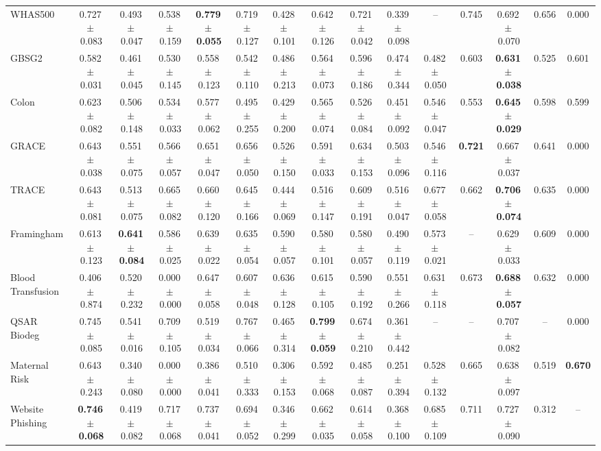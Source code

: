 \documentclass[8pt]{extarticle}
\begin{document}
\begin{longtable}{l*{14}{c}}
WHAS500 & 0.727\,$\pm$\,0.083 & 0.493\,$\pm$\,0.047 & 0.538\,$\pm$\,0.159 & \textbf{0.779\,$\pm$\,0.055} & 0.719\,$\pm$\,0.127 & 0.428\,$\pm$\,0.101 & 0.642\,$\pm$\,0.126 & 0.721\,$\pm$\,0.042 & 0.339\,$\pm$\,0.098 & -- & 0.745 & 0.692\,$\pm$\,0.070 & 0.656 & 0.000 \\
GBSG2 & 0.582\,$\pm$\,0.031 & 0.461\,$\pm$\,0.045 & 0.530\,$\pm$\,0.145 & 0.558\,$\pm$\,0.123 & 0.542\,$\pm$\,0.110 & 0.486\,$\pm$\,0.213 & 0.564\,$\pm$\,0.073 & 0.596\,$\pm$\,0.186 & 0.474\,$\pm$\,0.344 & 0.482\,$\pm$\,0.050 & 0.603 & \textbf{0.631\,$\pm$\,0.038} & 0.525 & 0.601 \\
Colon & 0.623\,$\pm$\,0.082 & 0.506\,$\pm$\,0.148 & 0.534\,$\pm$\,0.033 & 0.577\,$\pm$\,0.062 & 0.495\,$\pm$\,0.255 & 0.429\,$\pm$\,0.200 & 0.565\,$\pm$\,0.074 & 0.526\,$\pm$\,0.084 & 0.451\,$\pm$\,0.092 & 0.546\,$\pm$\,0.047 & 0.553 & \textbf{0.645\,$\pm$\,0.029} & 0.598 & 0.599 \\
GRACE & 0.643\,$\pm$\,0.038 & 0.551\,$\pm$\,0.075 & 0.566\,$\pm$\,0.057 & 0.651\,$\pm$\,0.047 & 0.656\,$\pm$\,0.050 & 0.526\,$\pm$\,0.150 & 0.591\,$\pm$\,0.033 & 0.634\,$\pm$\,0.153 & 0.503\,$\pm$\,0.096 & 0.546\,$\pm$\,0.116 & \textbf{0.721} & 0.667\,$\pm$\,0.037 & 0.641 & 0.000 \\
TRACE & 0.643\,$\pm$\,0.081 & 0.513\,$\pm$\,0.075 & 0.665\,$\pm$\,0.082 & 0.660\,$\pm$\,0.120 & 0.645\,$\pm$\,0.166 & 0.444\,$\pm$\,0.069 & 0.516\,$\pm$\,0.147 & 0.609\,$\pm$\,0.191 & 0.516\,$\pm$\,0.047 & 0.677\,$\pm$\,0.058 & 0.662 & \textbf{0.706\,$\pm$\,0.074} & 0.635 & 0.000 \\
Framingham & 0.613\,$\pm$\,0.123 & \textbf{0.641\,$\pm$\,0.084} & 0.586\,$\pm$\,0.025 & 0.639\,$\pm$\,0.022 & 0.635\,$\pm$\,0.054 & 0.590\,$\pm$\,0.057 & 0.580\,$\pm$\,0.101 & 0.580\,$\pm$\,0.057 & 0.490\,$\pm$\,0.119 & 0.573\,$\pm$\,0.021 & -- & 0.629\,$\pm$\,0.033 & 0.609 & 0.000 \\
Blood Transfusion & 0.406\,$\pm$\,0.874 & 0.520\,$\pm$\,0.232 & 0.000\,$\pm$\,0.000 & 0.647\,$\pm$\,0.058 & 0.607\,$\pm$\,0.048 & 0.636\,$\pm$\,0.128 & 0.615\,$\pm$\,0.105 & 0.590\,$\pm$\,0.192 & 0.551\,$\pm$\,0.266 & 0.631\,$\pm$\,0.118 & 0.673 & \textbf{0.688\,$\pm$\,0.057} & 0.632 & 0.000 \\
QSAR Biodeg & 0.745\,$\pm$\,0.085 & 0.541\,$\pm$\,0.016 & 0.709\,$\pm$\,0.105 & 0.519\,$\pm$\,0.034 & 0.767\,$\pm$\,0.066 & 0.465\,$\pm$\,0.314 & \textbf{0.799\,$\pm$\,0.059} & 0.674\,$\pm$\,0.210 & 0.361\,$\pm$\,0.442 & -- & -- & 0.707\,$\pm$\,0.082 & -- & 0.000 \\
Maternal Risk & 0.643\,$\pm$\,0.243 & 0.340\,$\pm$\,0.080 & 0.000\,$\pm$\,0.000 & 0.386\,$\pm$\,0.041 & 0.510\,$\pm$\,0.333 & 0.306\,$\pm$\,0.153 & 0.592\,$\pm$\,0.068 & 0.485\,$\pm$\,0.087 & 0.251\,$\pm$\,0.394 & 0.528\,$\pm$\,0.132 & 0.665 & 0.638\,$\pm$\,0.097 & 0.519 & \textbf{0.670} \\
Website Phishing & \textbf{0.746\,$\pm$\,0.068} & 0.419\,$\pm$\,0.082 & 0.717\,$\pm$\,0.068 & 0.737\,$\pm$\,0.041 & 0.694\,$\pm$\,0.052 & 0.346\,$\pm$\,0.299 & 0.662\,$\pm$\,0.035 & 0.614\,$\pm$\,0.058 & 0.368\,$\pm$\,0.100 & 0.685\,$\pm$\,0.109 & 0.711 & 0.727\,$\pm$\,0.090 & 0.312 & -- \\
\end{longtable}
\end{document}
